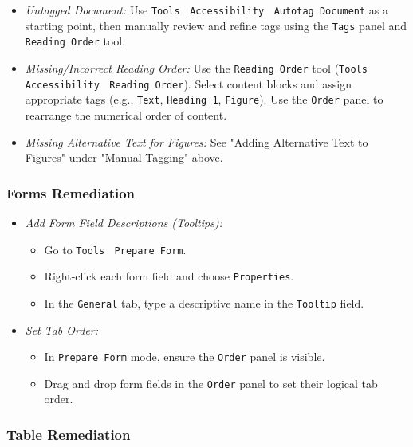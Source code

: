 \begin{itemize}
\item \emph{Untagged Document:} Use \texttt{Tools} $\>$ \texttt{Accessibility} $\>$ \texttt{Autotag Document} as a starting point, then manually review and refine tags using the \texttt{Tags} panel and \texttt{Reading Order} tool.
\item \emph{Missing/Incorrect Reading Order:} Use the \texttt{Reading Order} tool (\texttt{Tools} $\>$ \texttt{Accessibility} $\>$ \texttt{Reading Order}). Select content blocks and assign appropriate tags (e.g., \texttt{Text}, \texttt{Heading 1}, \texttt{Figure}). Use the \texttt{Order} panel to rearrange the numerical order of content.
\item \emph{Missing Alternative Text for Figures:} See "Adding Alternative Text to Figures" under "Manual Tagging" above.
\end{itemize}

\subsubsection{Forms Remediation}
\label{subsubsec:forms-remediation}

\begin{itemize}
\item \emph{Add Form Field Descriptions (Tooltips):}
    \begin{itemize}
    \item Go to \texttt{Tools} $\>$ \texttt{Prepare Form}.
    \item Right-click each form field and choose \texttt{Properties}.
    \item In the \texttt{General} tab, type a descriptive name in the \texttt{Tooltip} field.
    \end{itemize}
\item \emph{Set Tab Order:}
    \begin{itemize}
    \item In \texttt{Prepare Form} mode, ensure the \texttt{Order} panel is visible.
    \item Drag and drop form fields in the \texttt{Order} panel to set their logical tab order.
    \end{itemize}
\end{itemize}

\subsubsection{Table Remediation}
\label{subsubsec:table-remediation}

